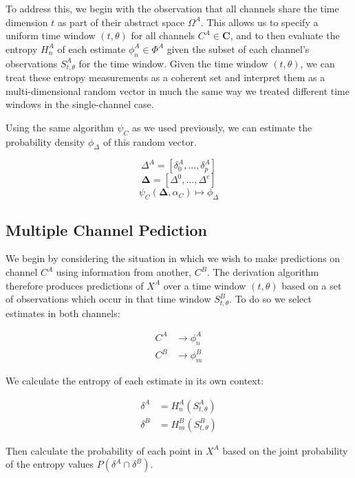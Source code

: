 \documentclass[10pt]{article}
\begin{document}
To address this, we begin with the observation that all channels share the time dimension \(t \) as part of their abstract space \(\Omega^A \).  This allows us to specify a uniform time window \((t,\theta) \) for all channels \(C^A \in \mathbf{C} \), and to then evaluate the entropy \(H_n^A \) of each estimate \(\phi_n^A \in \Phi^A \) given the subset of each channel's observations \(S_{t,\theta}^A \) for the time window.  Given the time window \((t,\theta) \), we can treat these entropy measurements as a coherent set and interpret them as a multi-dimensional random vector in much the same way we treated different time windows in the single-channel case.

Using the same algorithm \(\psi_C \) as we used previously, we can estimate the probability density \(\phi_\Delta \) of this random vector. 

\[ \Delta^A = [\delta_0^A,...,\delta_p^A] \nonumber  \]
\[ \boldsymbol{\Delta} = [\Delta^0,...,\Delta^c] \nonumber  \]
\begin{equation} \psi_C( \boldsymbol{\Delta} , \alpha_C ) \mapsto \phi_\Delta \end{equation}

\subsection{Multiple Channel Pediction}
We begin by considering the situation in which we wish to make predictions on channel \(C^A \) using information from another, \(C^B \).  The derivation algorithm therefore produces predictions of \(X^A \) over a time window \((t,\theta) \) based on a set of observations which occur in that time window \(S_{t,\theta}^B \).  To do so we select estimates in both channels:

\begin{align*}
C^A &\rightarrow \phi_n^A \\
C^B &\rightarrow \phi_m^B
\end{align*}

We calculate the entropy of each estimate in its own context:

\begin{align*}
\delta^A &= H_n^A( S_{t,\theta}^A ) \\
\delta^B &= H_m^B( S_{t,\theta}^B )
\end{align*}

Then calculate the probability of each point in \(X^A \) based on the joint probability of the entropy values \(P(\delta^A \cap \delta^B) \).
\end{document}
